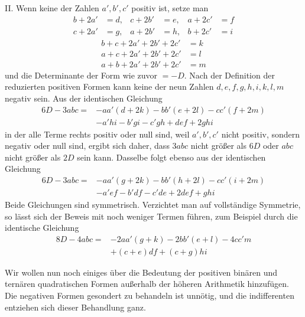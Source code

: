 II. Wenn keine der Zahlen $a',b',c'$ positiv ist, setze man
\[
\begin{aligned}
b+2a'&=d,&c+2b'&=e,&a+2c'&=f\\
c+2a'&=g,&a+2b'&=h,&b+2c'&=i
\end{aligned}
\]
\[
\begin{aligned}
b+c+2a'+2b'+2c'&=k\\
a+c+2a'+2b'+2c'&=l\\
a+b+2a'+2b'+2c'&=m
\end{aligned}
\]
und die Determinante der Form wie zuvor $=-D$. Nach der Definition der reduzierten positiven Formen kann keine der neun Zahlen $d,\allowbreak e,\allowbreak f,\allowbreak g,\allowbreak h,\allowbreak i,\allowbreak k,\allowbreak l,\allowbreak m$ negativ sein. Aus der identischen Gleichung
\[
\begin{aligned}
6D-3abc={}&-aa'(d+2k)-bb'(e+2l)-cc'(f+2m)\\
&-a'hi-b'gi-c'gh+def+2ghi
\end{aligned}
\]
in der alle Terme rechts positiv oder null sind, weil $a',b',c'$ nicht positiv, sondern negativ oder null sind, ergibt sich daher, dass $3abc$ nicht größer als $6D$ oder $abc$ nicht größer als $2D$ sein kann. Dasselbe folgt ebenso aus der identischen Gleichung
\[
\begin{aligned}
6D-3abc={}&-aa'(g+2k)-bb'(h+2l)-cc'(i+2m)\\
&-a'ef-b'df-c'de+2def+ghi
\end{aligned}
\]
Beide Gleichungen sind symmetrisch. Verzichtet man auf vollständige Symmetrie, so lässt sich der Beweis mit noch weniger Termen führen, zum Beispiel durch die identische Gleichung
\[
\begin{aligned}
8D-4abc={}&-2aa'(g+k)-2bb'(e+l)-4cc'm\\
&+(c+e)df+(c+g)hi
\end{aligned}
\]

Wir wollen nun noch einiges über die Bedeutung der positiven binären und ternären quadratischen Formen außerhalb der höheren Arithmetik hinzufügen. Die negativen Formen gesondert zu behandeln ist unnötig, und die indifferenten entziehen sich dieser Behandlung ganz.


